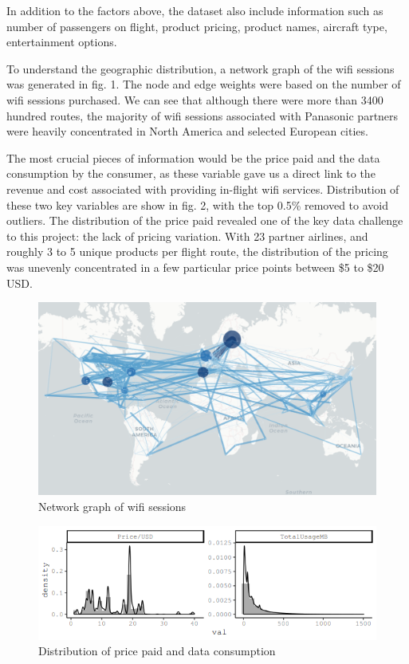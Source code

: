 \documentclass[]{article}
\begin{document}
In addition to the factors above, the dataset also include information
such as number of passengers on flight, product pricing, product names,
aircraft type, entertainment options.

To understand the geographic distribution, a network graph of the wifi
sessions was generated in fig. 1. The node and edge weights were based
on the number of wifi sessions purchased. We can see that although there
were more than 3400 hundred routes, the majority of wifi sessions
associated with Panasonic partners were heavily concentrated in North
America and selected European cities.

The most crucial pieces of information would be the price paid and the
data consumption by the consumer, as these variable gave us a direct
link to the revenue and cost associated with providing in-flight wifi
services. Distribution of these two key variables are show in fig. 2,
with the top 0.5\% removed to avoid outliers. The distribution of the
price paid revealed one of the key data challenge to this project: the
lack of pricing variation. With 23 partner airlines, and roughly 3 to 5
unique products per flight route, the distribution of the pricing was
unevenly concentrated in a few particular price points between \$5 to
\$20 USD.

\begin{figure}
\centering
\includegraphics[width=6.25in,height=\textheight]{figures/flight_network.png}
\caption{Network graph of wifi sessions}
\end{figure}

\begin{figure}
\centering
\includegraphics{figures/price_data_dist.png}
\caption{Distribution of price paid and data consumption}
\end{figure}
\end{document}
